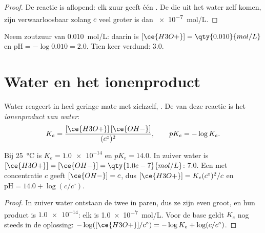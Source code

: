 \begin{proof}
De reactie  is aflopend: elk  zuur
geeft één . De  die uit het water zelf komen, zijn
verwaarloosbaar zolang $c$ veel groter is dan \qty{e-7}{mol/L}.
\end{proof}

\begin{example}[Zoutzuur]\label{ex:g12:ka-and-pka:hcl}
Neem zoutzuur van \qty{0.010}{mol/L}: daarin is
$[\ce{H3O+}] = \qty{0.010}{mol/L}$ en $\mathrm{pH} = -\log 0.010 = 2.0$. Tien keer verdund:  3.0.
\end{example}

\section{Water en het ionenproduct}


\begin{definition}\label{def:g12:ka-and-pka:ionic-product}
Water reageert in heel geringe mate met zichzelf,
. De  van deze reactie is het
\emph{ionenproduct van water}:
\[
  K_e = \frac{[\ce{H3O+}]\,[\ce{OH-}]}{(c^\circ)^2},
  \qquad pK_e = -\log K_e .
\]
\end{definition}

\begin{proposition}\label{prop:g12:ka-and-pka:ke}
Bij \qty{25}{\celsius} is $K_e = \num{1.0e-14}$ en $pK_e = 14.0$. In
zuiver water is $[\ce{H3O+}] = [\ce{OH-}] = \qty{1.0e-7}{mol/L}$:  7.0.
Een  met concentratie $c$ geeft $[\ce{OH-}] = c$, dus
$[\ce{H3O+}] = K_e (c^\circ)^2 / c$ en $\mathrm{pH} = 14.0 + \log(c/c^\circ)$.
\end{proposition}

\begin{proof}
In zuiver water ontstaan de twee  in paren, dus ze zijn even groot,
en hun product is $\num{1.0e-14}$: elk is \qty{1.0e-7}{mol/L}. Voor de
base geldt $K_e$ nog steeds in de oplossing:
$-\log([\ce{H3O+}]/c^\circ) = -\log K_e + \log(c/c^\circ)$.
\end{proof}


